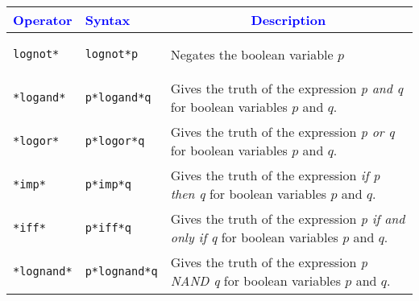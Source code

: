 \documentclass{article}
\begin{document}
\begin{center}
\begin{longtable}{llm{8cm}}
\toprule
\multicolumn{1}{c}{\textcolor{blue}{Operator}} & \multicolumn{1}{l}{\textcolor{blue}{Syntax}} & \multicolumn{1}{c}{\textcolor{blue}{Description}}  \\
\toprule
\begin{lstlisting}
lognot*
\end{lstlisting} &
\begin{lstlisting}
lognot*p
\end{lstlisting} & Negates the boolean variable \(p\)\\
\midrule
\begin{lstlisting}
*logand*
\end{lstlisting} &
\begin{lstlisting}
p*logand*q
\end{lstlisting} & Gives the truth of the expression \emph{p and q} for boolean variables \(p\) and \(q\).\\
\midrule
\begin{lstlisting}
*logor*
\end{lstlisting} &
\begin{lstlisting}
p*logor*q
\end{lstlisting} & Gives the truth of the expression \emph{p or q} for boolean variables \(p\) and \(q\).\\
\midrule
\begin{lstlisting}
*imp*
\end{lstlisting} &
\begin{lstlisting}
p*imp*q
\end{lstlisting} & Gives the truth of the expression \emph{if p then q} for boolean variables \(p\) and \(q\).\\
\midrule
\begin{lstlisting}
*iff*
\end{lstlisting} &
\begin{lstlisting}
p*iff*q
\end{lstlisting} & Gives the truth of the expression \emph{p if and only if q} for boolean variables \(p\) and \(q\).\\
\midrule
\begin{lstlisting}
*lognand*
\end{lstlisting} &
\begin{lstlisting}
p*lognand*q
\end{lstlisting} & Gives the truth of the expression \emph{ p NAND q} for boolean variables \(p\) and \(q\).\\

\end{longtable}
\end{center}
\end{document}
